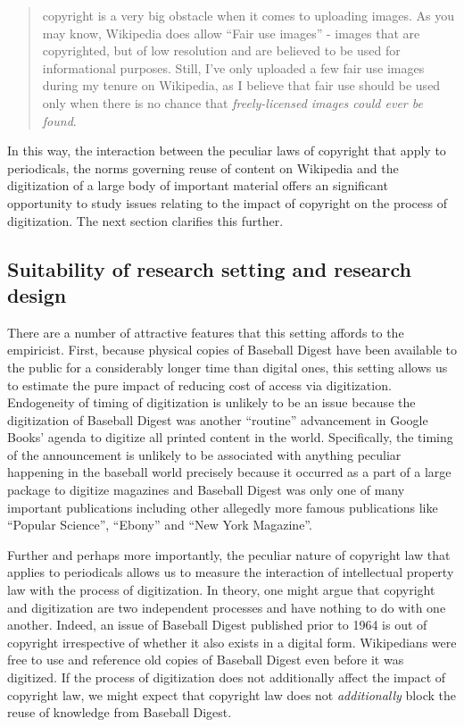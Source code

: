 \documentclass[12pt]{article}
\begin{document}
\begin{quotation}
copyright is a very big obstacle when it comes to uploading images. As you may know, Wikipedia does allow ``Fair use images'' - images that are copyrighted, but of low resolution and are believed to be used for informational purposes. Still, I've only uploaded a few fair use images during my tenure on Wikipedia, as I believe that fair use should be used only when there is no chance that \emph{freely-licensed images could ever be found}.
\end{quotation}

In this way, the interaction between the peculiar laws of copyright that apply to periodicals, the norms governing reuse of content on Wikipedia and the digitization of a large body of important material offers an significant opportunity to study issues relating to the impact of copyright on the process of digitization. The next section clarifies this further.

\subsection{Suitability of research setting and research design}

There are a number of attractive features that this setting affords to the empiricist. First, because physical copies of Baseball Digest have been available to the public for a considerably longer time than digital ones, this setting allows us to estimate the pure impact of reducing cost of access via digitization. Endogeneity of timing of digitization is unlikely to be an issue because the digitization of Baseball Digest was another ``routine'' advancement in Google Books' agenda to digitize all printed content in the world. Specifically, the timing of the announcement is unlikely to be associated with anything peculiar happening in the baseball world precisely because it occurred as a part of a large package to digitize magazines and Baseball Digest was only one of many important publications including other allegedly more famous publications like ``Popular Science'', ``Ebony'' and ``New York Magazine''. 

Further and perhaps more importantly, the peculiar nature of copyright law that applies to periodicals allows us to measure the interaction of intellectual property law with the process of digitization. In theory, one might argue that copyright and digitization are two independent processes and have nothing to do with one another. Indeed, an issue of Baseball Digest published prior to 1964 is out of copyright irrespective of whether it also exists in a digital form. Wikipedians were free to use and reference old copies of Baseball Digest even before it was digitized. If the process of digitization does not additionally affect the impact of copyright law, we might expect that copyright law does not \emph{additionally} block the reuse of knowledge from Baseball Digest. 
\end{document}
